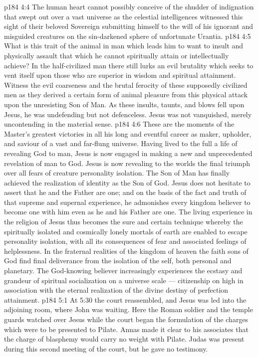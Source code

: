 \vs p184 4:4 \pc The human heart cannot possibly conceive of the shudder of indignation that swept out over a vast universe as the celestial intelligences witnessed this sight of their beloved Sovereign submitting himself to the will of his ignorant and misguided creatures on the sin\hyp{}darkened sphere of unfortunate Urantia.
\vs p184 4:5 What is this trait of the animal in man which leads him to want to insult and physically assault that which he cannot spiritually attain or intellectually achieve? In the half\hyp{}civilized man there still lurks an evil brutality which seeks to vent itself upon those who are superior in wisdom and spiritual attainment. Witness the evil coarseness and the brutal ferocity of these supposedly civilized men as they derived a certain form of animal pleasure from this physical attack upon the unresisting Son of Man. As these insults, taunts, and blows fell upon Jesus, he was undefending but not defenceless. Jesus was not vanquished, merely uncontending in the material sense.
\vs p184 4:6 These are the moments of the Master’s greatest victories in all his long and eventful career as maker, upholder, and saviour of a vast and far\hyp{}flung universe. Having lived to the full a life of revealing God to man, Jesus is now engaged in making a new and unprecedented revelation of man to God. Jesus is now revealing to the worlds the final triumph over all fears of creature personality isolation. The Son of Man has finally achieved the realization of identity as the Son of God. Jesus does not hesitate to assert that he and the Father are one; and on the basis of the fact and truth of that supreme and supernal experience, he admonishes every kingdom believer to become one with him even as he and his Father are one. The living experience in the religion of Jesus thus becomes the sure and certain technique whereby the spiritually isolated and cosmically lonely mortals of earth are enabled to escape personality isolation, with all its consequences of fear and associated feelings of helplessness. In the fraternal realities of the kingdom of heaven the faith sons of God find final deliverance from the isolation of the self, both personal and planetary. The God\hyp{}knowing believer increasingly experiences the ecstasy and grandeur of spiritual socialization on a universe scale --- citizenship on high in association with the eternal realization of the divine destiny of perfection attainment.
\vs p184 5:1 At 5:30 the court reassembled, and Jesus was led into the adjoining room, where John was waiting. Here the Roman soldier and the temple guards watched over Jesus while the court began the formulation of the charges which were to be presented to Pilate. Annas made it clear to his associates that the charge of blasphemy would carry no weight with Pilate. Judas was present during this second meeting of the court, but he gave no testimony.
